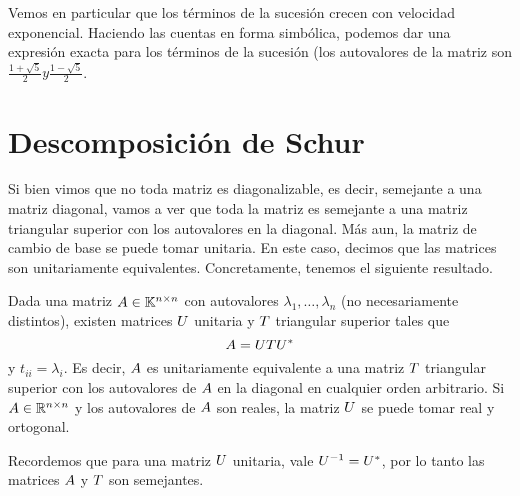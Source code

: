 Vemos en particular que los términos de la sucesión crecen con velocidad exponencial. Haciendo las cuentas en forma simbólica, podemos dar una expresión exacta para los términos de la sucesión (los autovalores de la matriz son $\frac{1+\sqrt{5}}{2} y \frac{1-\sqrt{5}}{2}$.










\section{Descomposición de Schur}
Si bien vimos que no toda matriz es diagonalizable, es decir, semejante a una matriz diagonal, vamos a ver que toda la matriz es semejante a una matriz triangular superior con los autovalores en la diagonal. Más aun, la matriz de cambio de base se puede tomar unitaria. En este caso, decimos que las matrices son unitariamente equivalentes. Concretamente, tenemos el siguiente resultado.

\begin{teo}
Dada una matriz $\Ab \in \Knn$ con autovalores $\lambda_1, \dots, \lambda_n$ (no necesariamente distintos), existen matrices $\Ub$ unitaria y $\Tb$ triangular superior tales que
$$
\Ab = \Ub \Tb \Ub^*
$$
y $t_{ii} = \lambda_i$. Es decir, $\Ab$ es unitariamente equivalente a una matriz $\Tb$ triangular superior con los autovalores de $\Ab$ en la diagonal en cualquier orden arbitrario. Si $\Ab \in \Rnn$ y los autovalores de $\Ab$ son reales, la matriz $\Ub$ se puede tomar real y ortogonal.
\end{teo}

Recordemos que para una matriz $\Ub$ unitaria, vale $\Ub^{-1} = \Ub^*$, por lo tanto las matrices $\Ab$ y $\Tb$ son semejantes.

